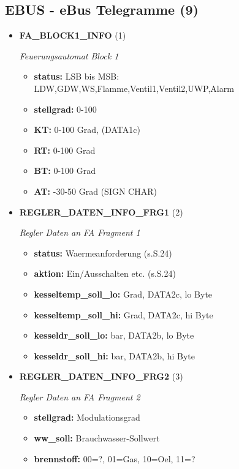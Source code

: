 \subsection{EBUS - eBus Telegramme (9)}
\begin{itemize}
		
\item \textbf{FA\_BLOCK1\_INFO} (1)

\textit{Feuerungsautomat Block 1}

\small
\begin{itemize}
		
\item \textbf{status:} LSB bis MSB: LDW,GDW,WS,Flamme,Ventil1,Ventil2,UWP,Alarm
\item \textbf{stellgrad:} 0-100%
\item \textbf{KT:} 0-100 Grad, (DATA1c)
\item \textbf{RT:} 0-100 Grad
\item \textbf{BT:} 0-100 Grad
\item \textbf{AT:} -30-50 Grad (SIGN CHAR)
\end{itemize}
\normalsize
	
\item \textbf{REGLER\_DATEN\_INFO\_FRG1} (2)

\textit{Regler Daten an FA Fragment 1}

\small
\begin{itemize}
		
\item \textbf{status:} Waermeanforderung (s.S.24)
\item \textbf{aktion:} Ein/Ausschalten etc. (s.S.24)
\item \textbf{kesseltemp\_soll\_lo:} Grad, DATA2c, lo Byte
\item \textbf{kesseltemp\_soll\_hi:} Grad, DATA2c, hi Byte
\item \textbf{kesseldr\_soll\_lo:} bar, DATA2b, lo Byte
\item \textbf{kesseldr\_soll\_hi:} bar, DATA2b, hi Byte
\end{itemize}
\normalsize
	
\item \textbf{REGLER\_DATEN\_INFO\_FRG2} (3)

\textit{Regler Daten an FA Fragment 2}

\small
\begin{itemize}
		
\item \textbf{stellgrad:} Modulationsgrad
\item \textbf{ww\_soll:} Brauchwasser-Sollwert
\item \textbf{brennstoff:} 00=?, 01=Gas, 10=Oel, 11=?
\end{itemize}
\normalsize
	
\end{itemize}
	
